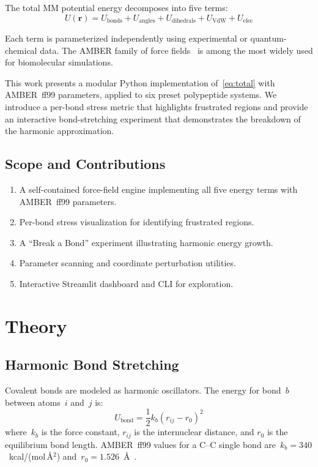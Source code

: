 \documentclass[conference]{IEEEtran}
\begin{document}
The total MM potential energy decomposes into five terms:
\begin{equation}\label{eq:total}
U(\mathbf{r}) = U_{\text{bonds}} + U_{\text{angles}} + U_{\text{dihedrals}}
    + U_{\text{VdW}} + U_{\text{elec}}
\end{equation}

Each term is parameterized independently using experimental or quantum-chemical
data.  The AMBER family of force fields~\cite{cornell1995, wang2004} is among
the most widely used for biomolecular simulations.

This work presents a modular Python implementation of~\cref{eq:total} with
AMBER~ff99 parameters, applied to six preset polypeptide systems.  We
introduce a per-bond stress metric that highlights frustrated regions and
provide an interactive bond-stretching experiment that demonstrates the
breakdown of the harmonic approximation.

\subsection{Scope and Contributions}

\begin{enumerate}
    \item A self-contained force-field engine implementing all five energy
          terms with AMBER~ff99 parameters.
    \item Per-bond stress visualization for identifying frustrated regions.
    \item A ``Break a Bond'' experiment illustrating harmonic energy growth.
    \item Parameter scanning and coordinate perturbation utilities.
    \item Interactive Streamlit dashboard and CLI for exploration.
\end{enumerate}

\section{Theory}

\subsection{Harmonic Bond Stretching}

Covalent bonds are modeled as harmonic oscillators.  The energy for bond~$b$
between atoms~$i$ and~$j$ is:
\begin{equation}\label{eq:bond}
U_{\text{bond}} = \frac{1}{2} k_b (r_{ij} - r_0)^2
\end{equation}
where~$k_b$ is the force constant, $r_{ij}$ is the internuclear distance, and
$r_0$ is the equilibrium bond length.  AMBER~ff99 values for a C--C single bond
are~$k_b = 340$~kcal/(mol\,\AA$^2$) and~$r_0 = 1.526$~\AA~\cite{cornell1995}.
\end{document}
